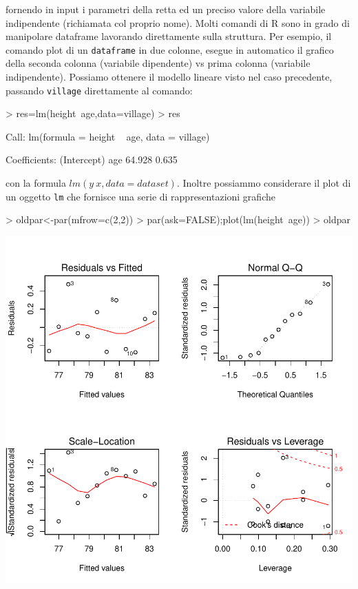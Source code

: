 \documentclass[onecolumn,11pt]{book}
\begin{document}
fornendo in input i parametri della retta ed un preciso valore della variabile indipendente (richiamata col proprio nome).
Molti comandi di \textsf{R} sono in grado di manipolare dataframe  lavorando direttamente sulla struttura. Per esempio, il comando plot di un \texttt{dataframe} in due colonne, esegue in automatico il grafico della seconda colonna (variabile dipendente) vs prima colonna (variabile indipendente).
Possiamo ottenere il modello lineare visto nel caso precedente, passando \texttt{village} direttamente al comando:
\begin{Schunk}
\begin{Sinput}
> res=lm(height~age,data=village) 
> res
\end{Sinput}
\begin{Soutput}
Call:
lm(formula = height ~ age, data = village)

Coefficients:
(Intercept)          age  
     64.928        0.635  
\end{Soutput}
\end{Schunk}
con la formula $lm(y ~x,data=dataset)$. 
Inoltre possiammo considerare il plot di un oggetto \texttt{lm}  che fornisce una serie di rappresentazioni grafiche
\begin{Schunk}
\begin{Sinput}
> oldpar<-par(mfrow=c(2,2))
> par(ask=FALSE);plot(lm(height~age))
> oldpar
\end{Sinput}
\end{Schunk}
\includegraphics{statisticaconR-330}
\end{document}
